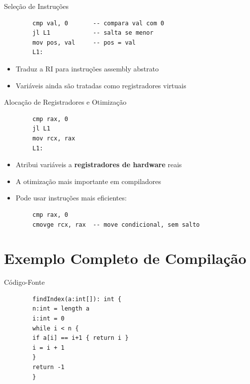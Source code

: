 \begin{frame}[fragile]{Seleção de Instruções}

    \begin{lstlisting}
        cmp val, 0       -- compara val com 0
        jl L1            -- salta se menor
        mov pos, val     -- pos = val
        L1:
    \end{lstlisting}

    \begin{itemize}

        \item
        Traduz a RI para instruções assembly abstrato
        \item
        Variáveis ainda são tratadas como registradores virtuais
    \end{itemize}
\end{frame}

\begin{frame}[fragile]{Alocação de Registradores e Otimização}

    \begin{lstlisting}
        cmp rax, 0
        jl L1
        mov rcx, rax
        L1:
    \end{lstlisting}

    \begin{itemize}

        \item
        Atribui variáveis a \textbf{registradores de hardware} reais
        \item
        A otimização mais importante em compiladores
        \item
        Pode usar instruções mais eficientes:
    \end{itemize}

    \begin{lstlisting}
        cmp rax, 0
        cmovge rcx, rax  -- move condicional, sem salto
    \end{lstlisting}
\end{frame}


\section{Exemplo Completo de
Compilação}\label{exemplo-completo-de-compilauxe7uxe3o}

\begin{frame}[fragile]{Código-Fonte}

    \begin{lstlisting}
        findIndex(a:int[]): int {
        n:int = length a
        i:int = 0
        while i < n {
        if a[i] == i+1 { return i }
        i = i + 1
        }
        return -1
        }
    \end{lstlisting}
\end{frame}

